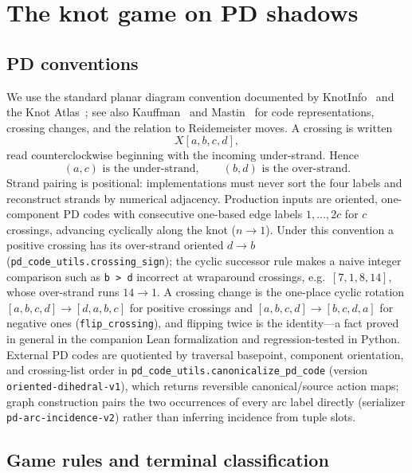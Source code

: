 \section{The knot game on PD shadows}
\label{sec:game}

\subsection{PD conventions}
\label{sec:pd}

We use the standard planar diagram convention documented by
KnotInfo~\cite{knotinfo-pd} and the Knot Atlas~\cite{katlas-pd}; see also
Kauffman~\cite{kauffman-mlinks} and Mastin~\cite{mastin2013links} for code
representations, crossing changes, and the relation to Reidemeister moves. A
crossing is written
\[
X[a,b,c,d],
\]
read counterclockwise beginning with the incoming under-strand. Hence
\[
\boxed{(a,c)\text{ is the under-strand}},\qquad
\boxed{(b,d)\text{ is the over-strand}}.
\]
Strand pairing is positional: implementations must never sort the four labels
and reconstruct strands by numerical adjacency. Production inputs are oriented,
one-component PD codes with consecutive one-based edge labels $1,\dots,2c$ for
$c$ crossings, advancing cyclically along the knot ($n \to 1$). Under this
convention a positive crossing has its over-strand oriented $d \to b$
(\texttt{pd\_code\_utils.crossing\_sign}); the cyclic successor rule makes a
naive integer comparison such as \texttt{b > d} incorrect at wraparound
crossings, e.g.\ $[7,1,8,14]$, whose over-strand runs $14 \to 1$. A crossing
change is the one-place cyclic rotation $[a,b,c,d] \to [d,a,b,c]$ for positive
crossings and $[a,b,c,d] \to [b,c,d,a]$ for negative ones
(\texttt{flip\_crossing}), and flipping twice is the identity---a fact proved
in general in the companion Lean formalization and regression-tested in Python.
External PD codes are quotiented by traversal basepoint, component
orientation, and crossing-list order in
\texttt{pd\_code\_utils.canonicalize\_pd\_code} (version
\texttt{oriented-dihedral-v1}), which returns reversible canonical/source
action maps; graph construction pairs the two occurrences of every arc label
directly (serializer \texttt{pd-arc-incidence-v2}) rather than inferring
incidence from tuple slots.

\subsection{Game rules and terminal classification}
\label{sec:rules}

